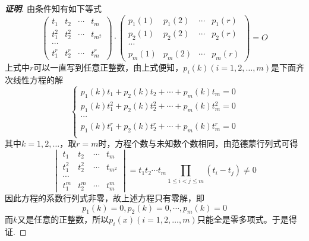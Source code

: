 \begin{proof}[\textbf{证明}]
  由条件知有如下等式
  \begin{equation*}
    \begin{pmatrix}
      t_1 & t_2 & \cdots & t_m \\
      t_1^2 & t_2^2 & \cdots & t_{m^2} \\
      \cdots \\
      t_1^r & t_2^r & \cdots & t_m^r
    \end{pmatrix}
    \cdot
    \begin{pmatrix}
      p_1(1) & p_1(2) & \cdots & p_1(r) \\
      p_2(1) & p_2(2) & \cdots & p_2(r) \\
      \cdots \\
      p_m(1) & p_m(2) & \cdots & p_m(r)
    \end{pmatrix}
    = O
  \end{equation*}
  上式中$r$可以一直写到任意正整数，由上式便知，$p_i(k)(i=1,2,\ldots,m)$是下面齐次线性方程的解
  \begin{equation*}
    \left\{
        \begin{array}{l}
         p_1(k)t_1+p_2(k)t_2+\cdots+p_m(k)t_m=0 \\
         p_1(k)t_1^2+p_2(k)t_2^2+\cdots+p_m(k)t_m^2=0 \\
          \cdots \\
         p_1(k)t_1^r+p_2(k)t_2^r+\cdots+p_m(k)t_m^r=0 \\
        \end{array}
        \right.
  \end{equation*}
  其中$k=1,2,\ldots$，取$r=m$时，方程个数与未知数个数相同，由范德蒙行列式可得
  \begin{equation*}
    \begin{vmatrix}
      t_1 & t_2 & \cdots & t_m \\
      t_1^2 & t_2^2 & \cdots & t_{m^2} \\
      \cdots \\
      t_1^m & t_2^m & \cdots & t_m^m
    \end{vmatrix}
    = t_1t_2\cdots t_m \prod_{1 \leqslant i < j \leqslant m}(t_i-t_j) \neq 0
  \end{equation*}
  因此方程的系数行列式非零，故上述方程只有零解，即
  \[ p_1(k)=0, p_2(k)=0, \cdots, p_m(k)=0 \]
  而$k$又是任意的正整数，所以$p_i(x)(i=1,2,\ldots,m)$只能全是零多项式。于是得证.
\end{proof}


